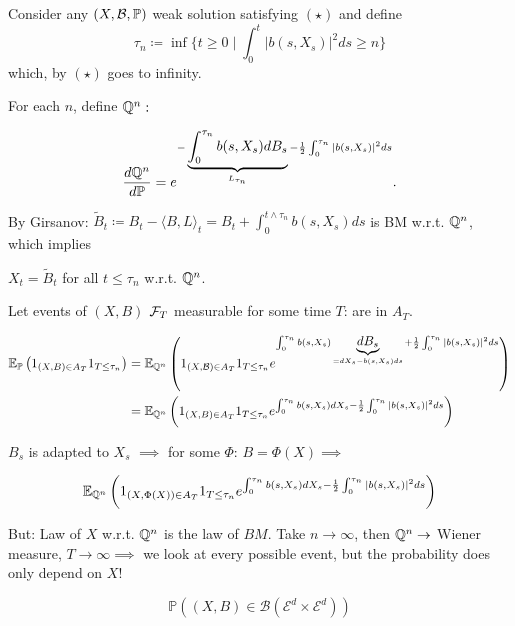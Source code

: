 Consider any $(X,\mathcal{B},\mathbb{P})$ weak solution satisfying $(\star)$ 
and define\[\tau_n\coloneqq \inf\{t\geq 0\mid \int_0^t|b(s,X_s)|^2ds\geq n\}\]
which, by $(\star)$ goes to infinity.

For each $n$, define $\mathbb{Q}^n:$

\[\frac{d\mathbb{Q}^n}{d\mathbb{P}}=e^{-\underbrace{\int_0^{\tau_n}b(s,X_s)dB_s}_{L_{\tau_n}}-\frac{1}{2}\int_0^{\tau_n}|b(s,X_s)|^2ds}.\]

By Girsanov: $\tilde{B}_t\coloneqq B_t-\langle B,L\rangle_t=B_t+\int_0^{t\land \tau_n} b(s,X_s)ds$
is BM w.r.t. $\mathbb{Q}^n$, which implies 

$X_t=\tilde{B}_t$ for all $t\leq \tau_n$ w.r.t. $\mathbb{Q}^n$.

Let events of $(X,B)$ $\mathcal{F}_T$ measurable for some time $T$: are in $A_T$.

\begin{align*}
    \mathbb{E}_{\mathbb{P}}\left(1_{(X,B)\in A_T}1_{T\leq \tau_n}\right)&=\mathbb{E}_{\mathbb{Q}^n}\left(1_{(X,\mathcal{B})\in A_T}1_{T\leq \tau_n}e^{\int_0^{\tau_n} b(s,X_s)\underbrace{dB_s}_{=dX_s-b(s,X_s)ds}+\frac{1}{2}\int_0^{\tau_n}|b(s,X_s)|^2ds}\right) \\
    &=\mathbb{E}_{\mathbb{Q}^n}\left(1_{(X,B)\in A_T}1_{T\leq \tau_n}e^{\int_0^{\tau_n} b(s,X_s)d X_s-\frac{1}{2}\int_0^{\tau_n}|b(s,X_s)|^2ds}\right) 
\end{align*}

$B_s$ is adapted to $X_s$ $\implies$ for some $\Phi$: $B=\Phi(X)\implies$

\begin{align*}
    \mathbb{E}_{\mathbb{Q}^n}\left(1_{(X,\Phi(X))\in A_T}1_{T\leq \tau_n}e^{\int_0^{\tau_n} b(s,X_s)d X_s-\frac{1}{2}\int_0^{\tau_n}|b(s,X_s)|^2ds}\right)    
\end{align*}

But: Law of $X$ w.r.t. $\mathbb{Q}^n$ is the law of $BM$. Take $n\to\infty$, then $\mathbb{Q}^n\to$ Wiener measure,
$T\to\infty \implies$ we look at every possible event, but the probability does only depend on $X$!

\[\mathbb{P}((X,B)\in\mathcal{B}(\mathcal{E}^d\times\mathcal{E}^d))\]





